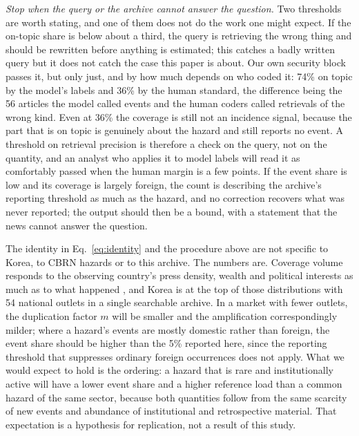 \documentclass[1p,times]{elsarticle}
\begin{document}
\emph{Stop when the query or the archive cannot answer the question.} Two thresholds are worth stating, and one of them does not do the work one might expect. If the on-topic share is below about a third, the query is retrieving the wrong thing and should be rewritten before anything is estimated; this catches a badly written query but it does not catch the case this paper is about. Our own security block passes it, but only just, and by how much depends on who coded it: 74\% on topic by the model's labels and 36\% by the human standard, the difference being the 56 articles the model called events and the human coders called retrievals of the wrong kind. Even at 36\% the coverage is still not an incidence signal, because the part that is on topic is genuinely about the hazard and still reports no event. A threshold on retrieval precision is therefore a check on the query, not on the quantity, and an analyst who applies it to model labels will read it as comfortably passed when the human margin is a few points. If the event share is low and its coverage is largely foreign, the count is describing the archive's reporting threshold as much as the hazard, and no correction recovers what was never reported; the output should then be a bound, with a statement that the news cannot answer the question.

The identity in Eq.~\eqref{eq:identity} and the procedure above are not specific to Korea, to CBRN hazards or to this archive. The numbers are. Coverage volume responds to the observing country's press density, wealth and political interests as much as to what happened \cite{galtung1965,vanbelle2000,zhu2018}, and Korea is at the top of those distributions with 54 national outlets in a single searchable archive. In a market with fewer outlets, the duplication factor $m$ will be smaller and the amplification correspondingly milder; where a hazard's events are mostly domestic rather than foreign, the event share should be higher than the 5\% reported here, since the reporting threshold that suppresses ordinary foreign occurrences does not apply. What we would expect to hold is the ordering: a hazard that is rare and institutionally active will have a lower event share and a higher reference load than a common hazard of the same sector, because both quantities follow from the same scarcity of new events and abundance of institutional and retrospective material. That expectation is a hypothesis for replication, not a result of this study.

\end{document}
